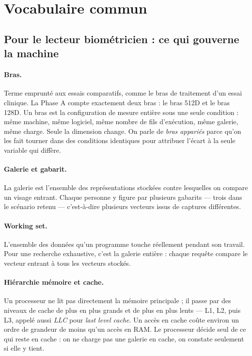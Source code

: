 \documentclass[11pt,a4paper]{article}
\newcommand{\terme}[1]{\emph{#1}}
\begin{document}
\section{Vocabulaire commun}\label{sec:vocabulaire}

\subsection{Pour le lecteur biométricien : ce qui gouverne la machine}

\paragraph{Bras.} Terme emprunté aux essais comparatifs, comme le bras de traitement
d'un essai clinique. La Phase A compte exactement deux bras : le bras 512D et le bras
128D. Un bras est la configuration de mesure entière sous une seule condition : même
machine, même logiciel, même nombre de fils d'exécution, même galerie, même charge.
Seule la dimension change. On parle de \terme{bras appariés} parce qu'on les fait
tourner dans des conditions identiques pour attribuer l'écart à la seule variable
qui diffère.

\paragraph{Galerie et gabarit.} La galerie est l'ensemble des représentations
stockées contre lesquelles on compare un visage entrant. Chaque personne y figure
par plusieurs gabarits — trois dans le scénario retenu — c'est-à-dire plusieurs
vecteurs issus de captures différentes.

\paragraph{Working set.} L'ensemble des données qu'un programme touche réellement
pendant son travail. Pour une recherche exhaustive, c'est la galerie entière :
chaque requête compare le vecteur entrant à tous les vecteurs stockés.

\paragraph{Hiérarchie mémoire et cache.} Un processeur ne lit pas directement la
mémoire principale ; il passe par des niveaux de cache de plus en plus grands et de
plus en plus lents — L1, L2, puis L3, appelé aussi \terme{LLC} pour \emph{last level
cache}. Un accès en cache coûte environ un ordre de grandeur de moins qu'un accès en
RAM. Le processeur décide seul de ce qui reste en cache : on ne \og charge \fg{} pas
une galerie en cache, on constate seulement si elle y tient.
\end{document}
